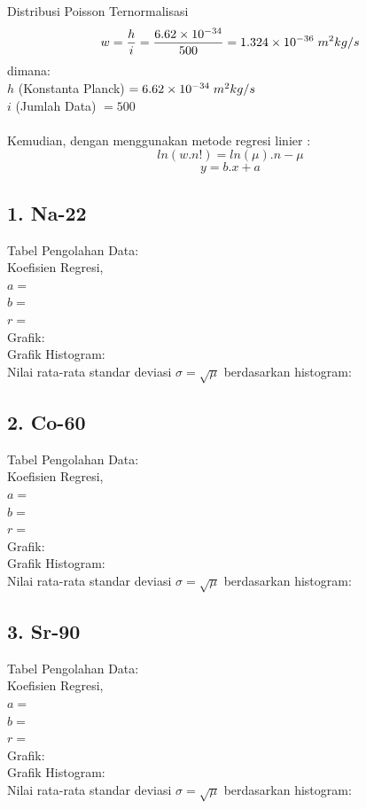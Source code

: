 \documentclass{article}
\begin{document}
		Distribusi Poisson Ternormalisasi
		\begin{equation}
			w = \frac{h}{i} = \frac{6.62\times10^{-34}}{500} = 1.324\times10^{-36} \hspace{0.1 cm} m^{2}kg/s
		\end{equation}
		dimana:\\
		$h$ (Konstanta Planck) $ = 6.62\times10^{-34} \hspace{0.1 cm} m^{2}kg/s$\\
		$i$ (Jumlah Data) $ = 500 $\\
		\\
		Kemudian, dengan menggunakan metode regresi linier :
		\begin{equation}
		ln(w.n!) = ln(\mu).n - \mu
		\end{equation}
		\begin{equation}
		y =  b.x+a
		\end{equation}
			
			\subsection*{1. Na-22}
			Tabel Pengolahan Data: \\
			Koefisien Regresi, \\
			$a = $ \\
			$b = $ \\
			$r = $ \\
			Grafik: \\
			Grafik Histogram: \\
			Nilai rata-rata standar deviasi $\sigma = \sqrt{\mu}$ berdasarkan histogram:\\
			
			\subsection*{2. Co-60}
			Tabel Pengolahan Data: \\
			Koefisien Regresi, \\
			$a = $ \\
			$b = $ \\
			$r = $ \\
			Grafik: \\
			Grafik Histogram: \\
			Nilai rata-rata standar deviasi $\sigma = \sqrt{\mu}$ berdasarkan histogram:\\
			
			\subsection*{3. Sr-90}
			Tabel Pengolahan Data: \\
			Koefisien Regresi, \\
			$a = $ \\
			$b = $ \\
			$r = $ \\
			Grafik: \\
			Grafik Histogram: \\
			Nilai rata-rata standar deviasi $\sigma = \sqrt{\mu}$ berdasarkan histogram:\\
				
\end{document}
